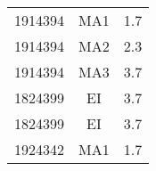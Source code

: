 \documentclass[a4paper,12pt]{article}
\begin{document}
		\begin{table}[h!]
		\begin{tabular}{c c c}
	1914394 & MA1 & 1.7\\ 1914394 & MA2 & 2.3\\ 1914394 & MA3 & 3.7\\ 1824399 & EI & 3.7\\ 1824399 & EI & 3.7\\ 1924342 & MA1 & 1.7\\ 
		\end{tabular}
		\end{table}
		
\end{document}
